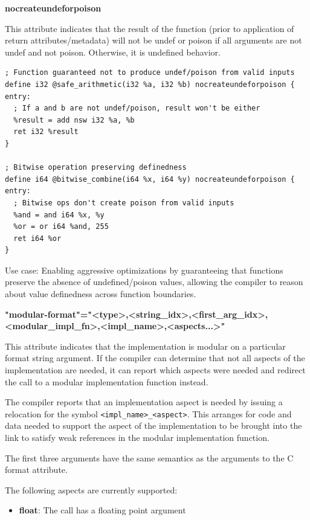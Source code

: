 \textbf{nocreateundeforpoison}

This attribute indicates that the result of the function (prior to application of return attributes/metadata) will not be undef or poison if all arguments are not undef and not poison.
Otherwise, it is undefined behavior.

\begin{lstlisting}[style=ir]
; Function guaranteed not to produce undef/poison from valid inputs
define i32 @safe_arithmetic(i32 %a, i32 %b) nocreateundeforpoison {
entry:
  ; If a and b are not undef/poison, result won't be either
  %result = add nsw i32 %a, %b
  ret i32 %result
}

; Bitwise operation preserving definedness
define i64 @bitwise_combine(i64 %x, i64 %y) nocreateundeforpoison {
entry:
  ; Bitwise ops don't create poison from valid inputs
  %and = and i64 %x, %y
  %or = or i64 %and, 255
  ret i64 %or
}
\end{lstlisting}

Use case: Enabling aggressive optimizations by guaranteeing that functions preserve the absence of undefined/poison values, allowing the compiler to reason about value definedness across function boundaries.

\textbf{"modular-format"="<type>,<string\_idx>,<first\_arg\_idx>,<modular\_impl\_fn>,<impl\_name>,<aspects...>"}

This attribute indicates that the implementation is modular on a particular format string argument.
If the compiler can determine that not all aspects of the implementation are needed, it can report which aspects were needed and redirect the call to a modular implementation function instead.

The compiler reports that an implementation aspect is needed by issuing a relocation for the symbol \texttt{<impl\_name>\_<aspect>}.
This arranges for code and data needed to support the aspect of the implementation to be brought into the link to satisfy weak references in the modular implementation function.

The first three arguments have the same semantics as the arguments to the C format attribute.

The following aspects are currently supported:

\begin{itemize}
\item \textbf{float}: The call has a floating point argument
\end{itemize}

